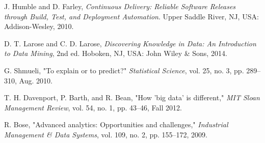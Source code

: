\documentclass[12pt,a4paper]{report}
\begin{document}
\begin{enumerate}
J. Humble and D. Farley, \textit{Continuous Delivery: Reliable Software Releases through Build, Test, and Deployment Automation}. Upper Saddle River, NJ, USA: Addison-Wesley, 2010.



D. T. Larose and C. D. Larose, \textit{Discovering Knowledge in Data: An Introduction to Data Mining}, 2nd ed. Hoboken, NJ, USA: John Wiley \& Sons, 2014.

G. Shmueli, "To explain or to predict?" \textit{Statistical Science}, vol. 25, no. 3, pp. 289--310, Aug. 2010.

T. H. Davenport, P. Barth, and R. Bean, "How 'big data' is different," \textit{MIT Sloan Management Review}, vol. 54, no. 1, pp. 43--46, Fall 2012.

R. Bose, "Advanced analytics: Opportunities and challenges," \textit{Industrial Management \& Data Systems}, vol. 109, no. 2, pp. 155--172, 2009.













































































\end{enumerate}
\end{document}
